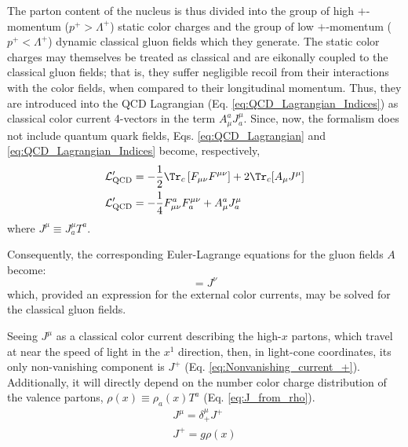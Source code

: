 The parton content of the nucleus is thus divided into the group of high $+$-momentum ($p^+ > \Lambda^+$) static color charges and the group of low $+$-momentum ($p^+ < \Lambda^+$) dynamic classical gluon fields which they generate. The static color charges may themselves be treated as classical \cite{Albacete_2014,McLerran_1994_classic_source}
and are eikonally coupled to the classical gluon fields; that is, they suffer negligible recoil from their interactions with the color fields, when compared to their longitudinal momentum.\cite{Gelis_2010} Thus, they are introduced into the \gls{QCD} Lagrangian (Eq. \ref{eq:QCD_Lagrangian_Indices}) as classical color current 4-vectors in the term $A_\mu^a J^\mu_a$. Since, now, the formalism does not include quantum quark fields, Eqs. \ref{eq:QCD_Lagrangian} and \ref{eq:QCD_Lagrangian_Indices} become, respectively,%
\begin{align}
	\mathcal{L}_\text{QCD}' & = - \frac{1}{2} \Tr_c \left[ F_{\mu \nu} F^{\mu \nu} \right] + 2 \Tr_c [A_\mu J^\mu] \\
	\mathcal{L}_\text{QCD}' & =  - \frac{1}{4} F_{\mu \nu}^a F^{\mu \nu}_a + A_\mu^a J^\mu_a
\end{align}
where $J^\mu \equiv J^\mu_a T^a$.

Consequently, the corresponding Euler-Lagrange equations for the gluon fields $A$ become:
\begin{equation}
	[D_\mu, F^{\mu \nu}] = J^\nu
\end{equation}
which, provided an expression for the external color currents, may be solved for the classical gluon fields.

Seeing $J^\mu$ as a classical color current describing the high-$x$ partons, which travel at near the speed of light in the $x^1$ direction, then, in light-cone coordinates, its only non-vanishing component is $J^+$ (Eq. \ref{eq:Nonvanishing_current_+}). Additionally, it will directly depend on the number color charge distribution of the valence partons, $\rho (x) \equiv \rho_a(x) T^a$ (Eq. \ref{eq:J_from_rho}).
\begin{gather}
	J^\mu = \delta^\mu_+ J^+ \label{eq:Nonvanishing_current_+} \\
	J^+ = g \rho (x) \label{eq:J_from_rho}
\end{gather}

